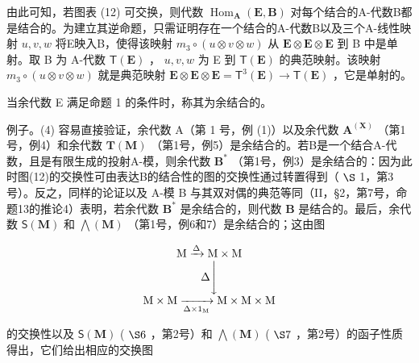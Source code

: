 由此可知，若图表 (12) 可交换，则代数 \(\operatorname{Hom}_{\mathbf{A}}(\mathbf{E}, \mathbf{B})\) 对每个结合的A-代数B都是结合的。为建立其逆命题，只需证明存在一个结合的A-代数B以及三个A-线性映射 \(u, v, w\) 将E映入B，使得该映射 \(m_3 \circ (u \otimes v \otimes w)\) 从 \(\mathbf{E} \otimes \mathbf{E} \otimes \mathbf{E}\) 到 B 中是单射。取 B 为 A-代数 \(\mathsf{T}(\mathbf{E})\) ， \(u, v, w\) 为 E 到 \(\mathsf{T}(\mathbf{E})\) 的典范映射。该映射 \(m_3 \circ (u \otimes v \otimes w)\) 就是典范映射 \(\mathbf{E} \otimes \mathbf{E} \otimes \mathbf{E} = \mathsf{T}^3(\mathbf{E}) \to \mathsf{T}(\mathbf{E})\) ，它是单射的。

当余代数 E 满足命题 1 的条件时，称其为余结合的。

例子。(4) 容易直接验证，余代数 A（第 1 号，例 (1)）以及余代数 \(\mathbf{A}^{(\mathbf{X})}\) （第1号，例4）和余代数 \(\mathbf{T}(\mathbf{M})\) （第1号，例5）是余结合的。若B是一个结合A-代数，且是有限生成的投射A-模，则余代数 \(\mathbf{B}^*\) （第1号，例3）是余结合的：因为此时图(12)的交换性可由表达B的结合性的图的交换性通过转置得到（ \(\S\) 1，第3号）。反之，同样的论证以及 A-模 B 与其双对偶的典范等同（II，§2，第7号，命题13的推论4）表明，若余代数 \(\mathbf{B}^*\) 是余结合的，则代数 \(\mathbf{B}\) 是结合的。最后，余代数 \(\mathsf{S}(\mathbf{M})\) 和 \(\bigwedge (\mathbf{M})\) （第1号，例6和7）是余结合的；这由图

\[
\begin{array}{c} \mathrm{M} \xrightarrow {\Delta} \mathrm{M} \times \mathrm{M} \\ \Delta \Biggl \downarrow \\ \mathrm{M} \times \mathrm{M} \xrightarrow [ \Delta \times 1 _ {\mathrm{M}} ]{} \mathrm{M} \times \mathrm{M} \times \mathrm{M} \end{array}
\]

的交换性以及 \(\mathsf{S}(\mathbf{M})\) ( \(\S 6\) ，第2号）和 \(\bigwedge (\mathbf{M})\) ( \(\S 7\) ，第2号）的函子性质得出，它们给出相应的交换图

